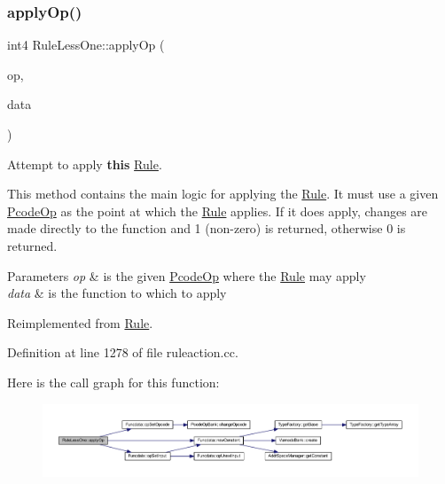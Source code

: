 \subsubsection{\texorpdfstring{applyOp()}{applyOp()}}
{\footnotesize\ttfamily int4 Rule\+Less\+One\+::apply\+Op (\begin{DoxyParamCaption}\item[{\mbox{\hyperlink{class_pcode_op}{Pcode\+Op}} $\ast$}]{op,  }\item[{\mbox{\hyperlink{class_funcdata}{Funcdata}} \&}]{data }\end{DoxyParamCaption})\hspace{0.3cm}{\ttfamily [virtual]}}



Attempt to apply {\bfseries{this}} \mbox{\hyperlink{class_rule}{Rule}}. 

This method contains the main logic for applying the \mbox{\hyperlink{class_rule}{Rule}}. It must use a given \mbox{\hyperlink{class_pcode_op}{Pcode\+Op}} as the point at which the \mbox{\hyperlink{class_rule}{Rule}} applies. If it does apply, changes are made directly to the function and 1 (non-\/zero) is returned, otherwise 0 is returned. 
\begin{DoxyParams}{Parameters}
{\em op} & is the given \mbox{\hyperlink{class_pcode_op}{Pcode\+Op}} where the \mbox{\hyperlink{class_rule}{Rule}} may apply \\
\hline
{\em data} & is the function to which to apply \\
\hline
\end{DoxyParams}


Reimplemented from \mbox{\hyperlink{class_rule_a4e3e61f066670175009f60fb9dc60848}{Rule}}.



Definition at line 1278 of file ruleaction.\+cc.

Here is the call graph for this function\+:
\nopagebreak
\begin{figure}[H]
\begin{center}
\leavevmode
\includegraphics[width=350pt]{class_rule_less_one_ac787cb9aa39e6d205659bdf236920619_cgraph}
\end{center}
\end{figure}
\mbox{\label{class_rule_less_one_aa048e872f55a1c8034660279f58f8e5b}} 
